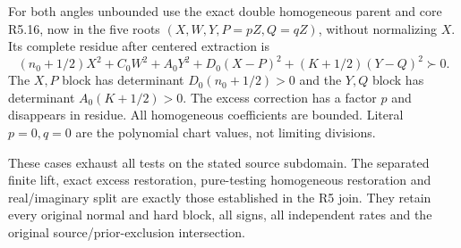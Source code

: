 For both angles unbounded use the exact double homogeneous parent and
core R5.16, now in the five roots $(X,W,Y,P=pZ,Q=qZ)$, without normalizing
$X$. Its complete residue after centered extraction is
\[
 (n_0+1/2)X^2+C_0W^2+A_0Y^2+D_0(X-P)^2
                                  +(K+1/2)(Y-Q)^2\succ0.        \tag{R6.7}
\]
The $X,P$ block has determinant $D_0(n_0+1/2)>0$ and the $Y,Q$ block
has determinant $A_0(K+1/2)>0$. The excess correction has a factor $p$
and disappears in residue. All homogeneous coefficients are bounded.
Literal $p=0,q=0$ are the polynomial chart values, not limiting divisions.

These cases exhaust all tests on the stated source subdomain. The
separated finite lift, exact excess restoration, pure-testing homogeneous
restoration and real/imaginary split are exactly those established in
the R5 join. They retain every original normal and hard block, all signs,
all independent rates and the original source/prior-exclusion intersection.
